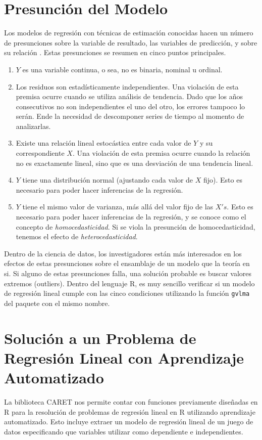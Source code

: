 \documentclass[letterpaper, spanish, 11pt]{report}
\begin{document}
\section{Presunción del Modelo}
Los modelos de regresión con técnicas de estimación conocidas hacen un número de presunciones sobre la variable de resultado, las variables de predicción, y sobre su relación \cite{daroczi}. Estas presunciones se resumen en cinco puntos principales.

\begin{enumerate}
	\item $Y$ es una variable continua, o sea, no es binaria, nominal u ordinal.
	\item Los residuos son estadísticamente independientes. Una violación de esta premisa ocurre cuando se utiliza análisis de tendencia. Dado que los años consecutivos no son independientes el uno del otro, los errores tampoco lo serán. Ende la necesidad de descomponer series de tiempo al momento de analizarlas.
	\item Existe una relación lineal estocástica entre cada valor de $Y$ y su correspondiente $X$. Una violación de esta premisa ocurre cuando la relación no es exactamente lineal, sino que es una desviación de una tendencia lineal.
	\item $Y$ tiene una distribución normal (ajustando cada valor de $X$ fijo). Esto es necesario para poder hacer inferencias de la regresión.
	\item $Y$ tiene el mismo valor de varianza, más allá del valor fijo de las $X's$. Esto es necesario para poder hacer inferencias de la regresión, y se conoce como el concepto de \emph{homocedasticidad}. Si se viola la presunción de homocedasticidad, tenemos el efecto de \emph{heterocedasticidad}.
\end{enumerate}

Dentro de la ciencia de datos, los investigadores están más interesados en los efectos de estas presunciones sobre el ensamblaje de un modelo que la teoría en si. Si alguno de estas presunciones falla, una solución probable es buscar valores extremos (outliers). Dentro del lenguaje R, es muy sencillo verificar si un modelo de regresión lineal cumple con las cinco condiciones utilizando la función \texttt{gvlma} del paquete con el mismo nombre.

\section{Solución a un Problema de Regresión Lineal con Aprendizaje Automatizado}
La biblioteca CARET nos permite contar con funciones previamente diseñadas en R para la resolución de problemas de regresión lineal en R utilizando aprendizaje automatizado. Esto incluye extraer un modelo de regresión lineal de un juego de datos especificando que variables utilizar como dependiente e independientes.
\end{document}
